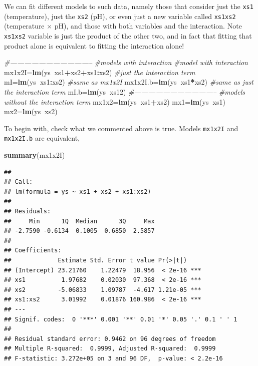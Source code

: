\documentclass[
]{book}
\newenvironment{Shaded}{\begin{snugshade}}{\end{snugshade}}
\newcommand{\CommentTok}[1]{\textcolor[rgb]{0.56,0.35,0.01}{\textit{#1}}}
\newcommand{\KeywordTok}[1]{\textcolor[rgb]{0.13,0.29,0.53}{\textbf{#1}}}
\newcommand{\NormalTok}[1]{#1}
\newcommand{\OperatorTok}[1]{\textcolor[rgb]{0.81,0.36,0.00}{\textbf{#1}}}
\begin{document}
We can fit different models to such data, namely those that consider just the \texttt{xs1} (temperature), just the \texttt{xs2} (pH), or even just a new variable called \texttt{xs1xs2} (temperature \(\times\) pH), and those with both variables and the interaction. Note \texttt{xs1xs2} variable is just the product of the other two, and in fact that fitting that product alone is equivalent to fitting the interaction alone!

\begin{Shaded}
\begin{Highlighting}[]
\CommentTok{#-----------------------------------}
\CommentTok{#models with interaction}
\CommentTok{#model with interaction}
\NormalTok{mx1x2I=}\KeywordTok{lm}\NormalTok{(ys}\OperatorTok{~}\NormalTok{xs1}\OperatorTok{+}\NormalTok{xs2}\OperatorTok{+}\NormalTok{xs1}\OperatorTok{:}\NormalTok{xs2)}
\CommentTok{#just the interaction term}
\NormalTok{mI=}\KeywordTok{lm}\NormalTok{(ys}\OperatorTok{~}\NormalTok{xs1}\OperatorTok{:}\NormalTok{xs2)}
\CommentTok{#same as mx1x2I}
\NormalTok{mx1x2I.b=}\KeywordTok{lm}\NormalTok{(ys}\OperatorTok{~}\NormalTok{xs1}\OperatorTok{*}\NormalTok{xs2)}
\CommentTok{#same as just the interaction term}
\NormalTok{mI.b=}\KeywordTok{lm}\NormalTok{(ys}\OperatorTok{~}\NormalTok{xs12)}
\CommentTok{#-----------------------------------}
\CommentTok{#models without the interaction term}
\NormalTok{mx1x2=}\KeywordTok{lm}\NormalTok{(ys}\OperatorTok{~}\NormalTok{xs1}\OperatorTok{+}\NormalTok{xs2)}
\NormalTok{mx1=}\KeywordTok{lm}\NormalTok{(ys}\OperatorTok{~}\NormalTok{xs1)}
\NormalTok{mx2=}\KeywordTok{lm}\NormalTok{(ys}\OperatorTok{~}\NormalTok{xs2)}
\end{Highlighting}
\end{Shaded}

To begin with, check what we commented above is true. Models \texttt{mx1x2I} and \texttt{mx1x2I.b} are equivalent,

\begin{Shaded}
\begin{Highlighting}[]
\KeywordTok{summary}\NormalTok{(mx1x2I)}
\end{Highlighting}
\end{Shaded}

\begin{verbatim}
## 
## Call:
## lm(formula = ys ~ xs1 + xs2 + xs1:xs2)
## 
## Residuals:
##     Min      1Q  Median      3Q     Max 
## -2.7590 -0.6134  0.1005  0.6850  2.5857 
## 
## Coefficients:
##             Estimate Std. Error t value Pr(>|t|)    
## (Intercept) 23.21760    1.22479  18.956  < 2e-16 ***
## xs1          1.97682    0.02030  97.368  < 2e-16 ***
## xs2         -5.06833    1.09787  -4.617 1.21e-05 ***
## xs1:xs2      3.01992    0.01876 160.986  < 2e-16 ***
## ---
## Signif. codes:  0 '***' 0.001 '**' 0.01 '*' 0.05 '.' 0.1 ' ' 1
## 
## Residual standard error: 0.9462 on 96 degrees of freedom
## Multiple R-squared:  0.9999,	Adjusted R-squared:  0.9999 
## F-statistic: 3.272e+05 on 3 and 96 DF,  p-value: < 2.2e-16
\end{verbatim}
\end{document}
